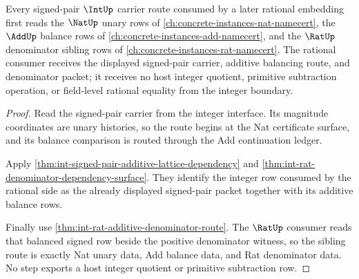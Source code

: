 \begin{theorem}
\label{thm:int-nat-add-rat-sibling-route}
Every signed-pair $\IntUp$ carrier route consumed by a later rational embedding
first reads the $\NatUp$ unary rows of
\autoref{ch:concrete-instances-nat-namecert}, the $\AddUp$ balance rows of
\autoref{ch:concrete-instances-add-namecert}, and the $\RatUp$ denominator
sibling rows of \autoref{ch:concrete-instances-rat-namecert}. The rational
consumer receives the displayed signed-pair carrier, additive balancing route,
and denominator packet; it receives no host integer quotient, primitive
subtraction operation, or field-level rational equality from the integer
boundary.
\end{theorem}
\begin{proof}
Read the signed-pair carrier from the integer interface. Its magnitude
coordinates are unary histories, so the route begins at the Nat certificate
surface, and its balance comparison is routed through the Add continuation
ledger.

Apply \autoref{thm:int-signed-pair-additive-lattice-dependency} and
\autoref{thm:int-rat-denominator-dependency-surface}. They identify the
integer row consumed by the rational side as the already displayed signed-pair
packet together with its additive balance rows.

Finally use \autoref{thm:int-rat-additive-denominator-route}. The $\RatUp$
consumer reads that balanced signed row beside the positive denominator
witness, so the sibling route is exactly Nat unary data, Add balance data, and
Rat denominator data. No step exports a host integer quotient or primitive
subtraction row.
\end{proof}

